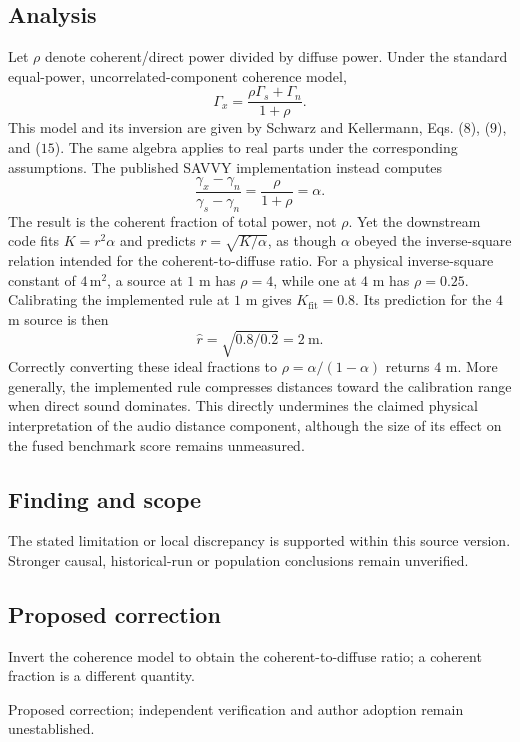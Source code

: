 \documentclass[11pt]{article}
\begin{document}
\subsection*{Analysis}

Let \(\rho\) denote coherent/direct power divided by diffuse power. Under the standard equal-power, uncorrelated-component coherence model, \[
\Gamma_x=\frac{\rho\Gamma_s+\Gamma_n}{1+\rho}.
\] This model and its inversion are given by Schwarz and Kellermann, Eqs. (\(8\)), (\(9\)), and (\(15\)). The same algebra applies to real parts under the corresponding assumptions. The published SAVVY implementation instead computes \[
\frac{\gamma_x-\gamma_n}{\gamma_s-\gamma_n}
=\frac{\rho}{1+\rho}=\alpha.
\] The result is the coherent fraction of total power, not \(\rho\). Yet the downstream code fits \(K=r^2\alpha\) and predicts \(r=\sqrt{K/\alpha}\), as though \(\alpha\) obeyed the inverse-square relation intended for the coherent-to-diffuse ratio. For a physical inverse-square constant of \(4\,\mathrm{m}^2\), a source at \(1\) m has \(\rho=4\), while one at \(4\) m has \(\rho=0.25\). Calibrating the implemented rule at \(1\) m gives \(K_{\mathrm{fit}}=0.8\). Its prediction for the \(4\) m source is then \[
\widehat r=\sqrt{0.8/0.2}=2\ \mathrm{m}.
\] Correctly converting these ideal fractions to \(\rho=\alpha/(1-\alpha)\) returns \(4\) m. More generally, the implemented rule compresses distances toward the calibration range when direct sound dominates. This directly undermines the claimed physical interpretation of the audio distance component, although the size of its effect on the fused benchmark score remains unmeasured.

\subsection*{Finding and scope}

The stated limitation or local discrepancy is supported within this source version. Stronger causal, historical-run or population conclusions remain unverified.

\subsection*{Proposed correction}

Invert the coherence model to obtain the coherent-to-diffuse ratio; a coherent fraction is a different quantity.

Proposed correction; independent verification and author adoption remain unestablished.
\end{document}
